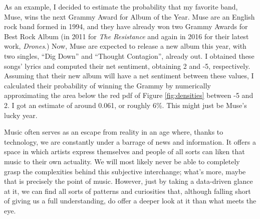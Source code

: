 \documentclass{article}
\begin{document}
As an example, I decided to estimate the probability that my favorite band, Muse, wins the next Grammy Award for Album of the Year. Muse are an English rock band formed in 1994, and they have already won two Grammy Awards for Best Rock Album (in 2011 for \textit{The Resistance} and again in 2016 for their latest work, \textit{Drones}.) Now, Muse are expected to release a new album this year, with two singles, ``Dig Down'' and ``Thought Contagion'', already out. I obtained these songs' lyrics and computed their net sentiment, obtaining 2 and -5, respectively. Assuming that their new album will have a net sentiment between these values, I calculated their probability of winning the Grammy by numerically approximating the area below the {\color{Salmon}red} pdf of Figure \ref{fig:densities} between -5 and 2. I got an estimate of around 0.061, or roughly 6\%. This might just be Muse's lucky year. \\


\FloatBarrier


Music often serves as an escape from reality in an age where, thanks to technology, we are constantly under a barrage of news and information. It offers a space in which artists express themselves and people of all sorts can liken that music to their own actuality. We will most likely never be able to completely grasp the complexities behind this subjective interchange; what's more, maybe that is precisely the point of music. However, just by taking a data-driven glance at it, we can find all sorts of patterns and curiosities that, although falling short of giving us a full understanding, do offer a deeper look at it than what meets the eye.




\FloatBarrier
\nocite{*}

\end{document}

